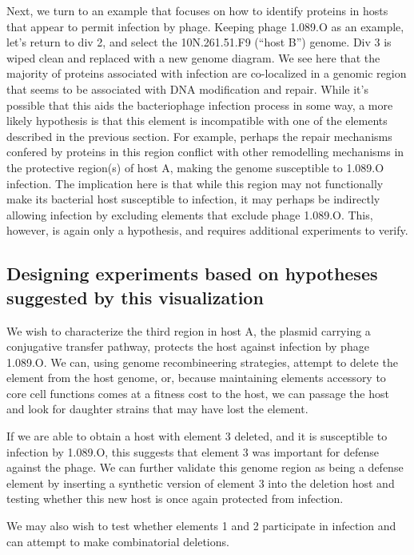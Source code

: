 \documentclass[12pt,twoside]{mitthesis-manusdown}
\begin{document}
Next, we turn to an example that focuses on how to identify proteins in
hosts that appear to permit infection by phage. Keeping phage 1.089.O as
an example, let's return to div 2, and select the 10N.261.51.F9 (``host
B'') genome. Div 3 is wiped clean and replaced with a new genome
diagram. We see here that the majority of proteins associated with
infection are co-localized in a genomic region that seems to be
associated with DNA modification and repair. While it's possible that
this aids the bacteriophage infection process in some way, a more likely
hypothesis is that this element is incompatible with one of the elements
described in the previous section. For example, perhaps the repair
mechanisms confered by proteins in this region conflict with other
remodelling mechanisms in the protective region(s) of host A, making the
genome susceptible to 1.089.O infection. The implication here is that
while this region may not functionally make its bacterial host
susceptible to infection, it may perhaps be indirectly allowing
infection by excluding elements that exclude phage 1.089.O. This,
however, is again only a hypothesis, and requires additional experiments
to verify.

\subsection{Designing experiments based on hypotheses suggested by this
visualization}\label{designing-experiments-based-on-hypotheses-suggested-by-this-visualization}

We wish to characterize the third region in host A, the plasmid carrying
a conjugative transfer pathway, protects the host against infection by
phage 1.089.O. We can, using genome recombineering strategies, attempt
to delete the element from the host genome, or, because maintaining
elements accessory to core cell functions comes at a fitness cost to the
host, we can passage the host and look for daughter strains that may
have lost the element.

If we are able to obtain a host with element 3 deleted, and it is
susceptible to infection by 1.089.O, this suggests that element 3 was
important for defense against the phage. We can further validate this
genome region as being a defense element by inserting a synthetic
version of element 3 into the deletion host and testing whether this new
host is once again protected from infection.

We may also wish to test whether elements 1 and 2 participate in
infection and can attempt to make combinatorial deletions.
\end{document}
